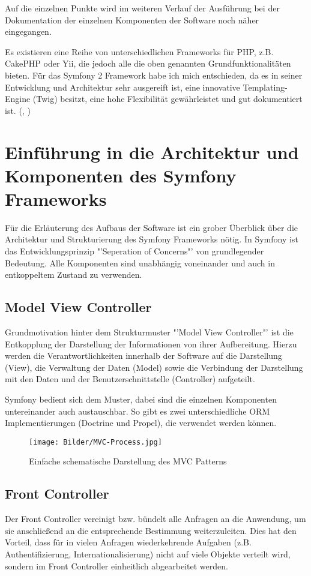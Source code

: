 \documentclass[12pt]{report}
\begin{document}
Auf die einzelnen Punkte wird im weiteren Verlauf der Ausführung bei der Dokumentation der einzelnen Komponenten der Software noch näher eingegangen.

Es existieren eine Reihe von unterschiedlichen Frameworks für PHP, z.B. CakePHP oder Yii, die jedoch alle die oben genannten Grundfunktionalitäten bieten. Für das Symfony 2 Framework habe ich mich entschieden, da es in seiner Entwicklung und Architektur sehr ausgereift ist, eine innovative Templating-Engine (Twig) besitzt, eine hohe Flexibilität gewährleistet und gut dokumentiert ist.
(\cite{PHPFrameworksComparision}, \cite{wiki:FrameworksComparision})






\chapter{Einführung in die Architektur und Komponenten des Symfony Frameworks}
Für die Erläuterung des Aufbaus der Software ist ein grober Überblick über die Architektur und Strukturierung des Symfony Frameworks nötig. In Symfony ist das Entwicklungsprinzip "'Seperation of Concerns"' von grundlegender Bedeutung. Alle Komponenten sind unabhängig voneinander und auch in entkoppeltem Zustand zu verwenden.

\section{Model View Controller}
Grundmotivation hinter dem Strukturmuster "'Model View Controller"' ist die Entkopplung der Darstellung der Informationen von ihrer Aufbereitung. Hierzu werden die Verantwortlichkeiten innerhalb der Software auf die Darstellung (View), die Verwaltung der Daten (Model) sowie die Verbindung der Darstellung mit den Daten und der Benutzerschnittstelle (Controller) aufgeteilt.\cite{MVC}

Symfony bedient sich dem Muster, dabei sind die einzelnen Komponenten untereinander auch austauschbar. So gibt es zwei unterschiedliche ORM Implementierungen (Doctrine und Propel), die verwendet werden können.

\begin{figure}[htp]
\centering
\texttt{[image: Bilder/MVC-Process.jpg]}
\caption{Einfache schematische Darstellung des MVC Patterns}
\label{}
\end{figure}

\section{Front Controller}
Der Front Controller vereinigt bzw. bündelt alle Anfragen an die Anwendung, um sie anschließend an die entsprechende Bestimmung weiterzuleiten. Dies hat den Vorteil, dass für in vielen Anfragen wiederkehrende Aufgaben (z.B. Authentifizierung, Internationalisierung) nicht auf viele Objekte verteilt wird, sondern im Front Controller einheitlich abgearbeitet werden.
\cite{FrontController}
\end{document}
